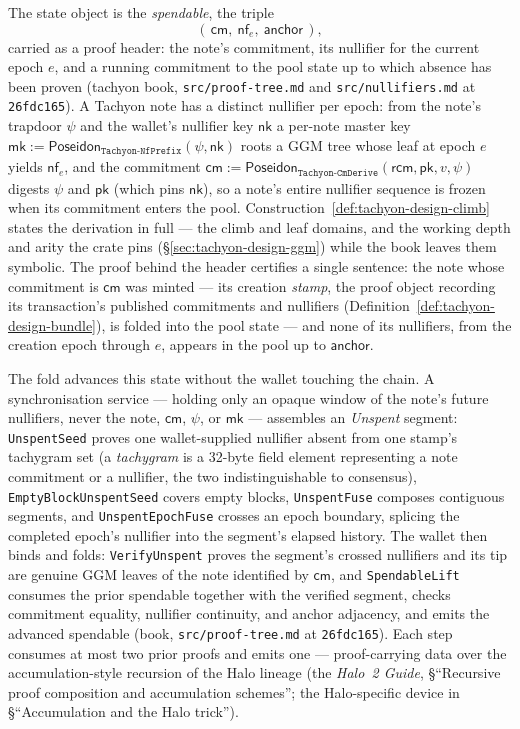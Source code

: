 \documentclass[11pt,a4paper]{article}
\theoremstyle{definition}
\newcommand{\nfsym}{\mathsf{nf}}
\newcommand{\cmsym}{\mathsf{cm}}
\newcommand{\nksym}{\ensuremath{\mathsf{nk}}}
\newcommand{\rcm}{\ensuremath{\mathsf{rcm}}}
\begin{document}
The state object is the \emph{spendable}, the triple
\[
(\,\cmsym,\ \nfsym_e,\ \mathsf{anchor}\,),
\]
carried as a proof header: the note's commitment, its nullifier for the
current epoch $e$, and a running commitment to the pool state up to which
absence has been proven (tachyon book, \texttt{src/proof-tree.md} and
\texttt{src/nullifiers.md} at \texttt{26fdc165}). A Tachyon note has a
distinct nullifier per epoch: from the note's trapdoor $\psi$ and the
wallet's nullifier key $\nksym$ a per-note master key
$\mathsf{mk} := \mathsf{Poseidon}_{\texttt{Tachyon-NfPrefix}}(\psi, \nksym)$
roots a GGM tree whose leaf at epoch $e$ yields $\nfsym_e$, and the
commitment
$\cmsym := \mathsf{Poseidon}_{\texttt{Tachyon-CmDerive}}(\rcm, \mathsf{pk},
v, \psi)$ digests $\psi$ and $\mathsf{pk}$ (which pins $\nksym$), so a note's
entire nullifier sequence is frozen when its commitment enters the pool.
Construction~\ref{def:tachyon-design-climb} states the derivation in full
--- the climb and leaf domains, and the working depth and arity the crate
pins (\S\ref{sec:tachyon-design-ggm}) while the book leaves them symbolic.
The proof behind the header certifies a single sentence: the note whose
commitment is $\cmsym$ was minted --- its creation \emph{stamp}, the proof
object recording its transaction's published commitments and nullifiers
(Definition~\ref{def:tachyon-design-bundle}), is folded into the
pool state --- and none of its nullifiers, from the creation epoch through
$e$, appears in the pool up to $\mathsf{anchor}$.

The fold advances this state without the wallet touching the chain. A
synchronisation service --- holding only an opaque window of the note's
future nullifiers, never the note, $\cmsym$, $\psi$, or $\mathsf{mk}$ ---
assembles an \emph{Unspent} segment: \texttt{UnspentSeed} proves one
wallet-supplied nullifier absent from one stamp's tachygram set (a
\emph{tachygram} is a 32-byte field element representing a note commitment
or a nullifier, the two indistinguishable to consensus),
\texttt{EmptyBlockUnspentSeed} covers empty blocks, \texttt{UnspentFuse}
composes contiguous segments, and \texttt{UnspentEpochFuse} crosses an epoch
boundary, splicing the completed epoch's nullifier into the segment's
elapsed history. The wallet then binds and folds: \texttt{VerifyUnspent}
proves the segment's crossed nullifiers and its tip are genuine GGM leaves of
the note identified by $\cmsym$, and \texttt{SpendableLift} consumes the
prior spendable together with the verified segment, checks commitment
equality, nullifier continuity, and anchor adjacency, and emits the advanced
spendable (book, \texttt{src/proof-tree.md} at \texttt{26fdc165}). Each step
consumes at most two prior proofs and emits one --- proof-carrying data over
the accumulation-style recursion of the Halo lineage (the \emph{Halo~2
Guide}, \S``Recursive proof composition and accumulation schemes''; the
Halo-specific device in \S``Accumulation and the Halo trick'').
\end{document}
